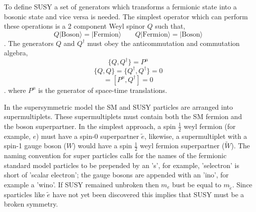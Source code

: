 To define SUSY a set of generators which 
transforms a fermionic state into a bosonic state and vice versa is needed. The simplest 
operator which can perform these operations is a 2 component Weyl spinor $Q$
such that,
\begin{equation}
Q|\mathrm{Boson}\rangle=|\mathrm{Fermion}\rangle \qquad Q|\mathrm{Fermion}\rangle=|\mathrm{Boson}\rangle
\end{equation}.
The generators $Q$ and $Q^{\dagger}$ must obey the anticommutation
and commutation algebra,
\begin{equation}
\{Q,Q^{\dagger}\}=P^{\mu}
\end{equation}
\begin{equation}
\{Q,Q\}=\{Q^{\dagger},Q^{\dagger}\}=0
\end{equation}
\begin{equation}
[P^{\mu},Q ]=[P^{\mu},Q^{\dagger}]=0
\end{equation}.
where $P^{\mu}$ is the generator of space-time translations.

In the supersymmetric model the SM and SUSY particles are arranged
into supermultiplets. These supermultiplets must contain both the SM fermion
and the boson superpartner. In the simplest approach, a  spin $\frac{1}{2}$
weyl fermion (for example, $e$) must have %
a spin-0 superpartner $\tilde{e}$, likewise, a supermultiplet with a spin-1 gauge boson ($W$) would have
 a spin $\frac{1}{2}$ weyl fermion superpartner ($\tilde{W}$).
The naming convention for super particles calls for the names of
the fermionic standard model particles to be prepended by an 's', for example, 
'selectron' is short of 'scalar electron'; the gauge bosons are appended
with an 'ino', for example a 'wino'. If SUSY remained unbroken
then $m_{e}$ bust be equal to $m_{\tilde{e}}$. Since sparticles like $\tilde{e}$ have not 
yet been discovered this implies that SUSY must be a broken
symmetry.

